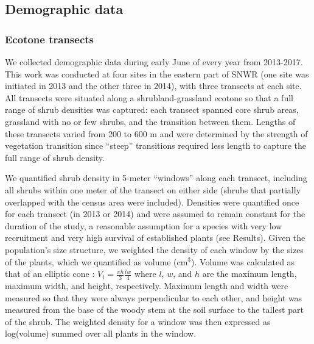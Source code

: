 \documentclass[11pt]{article}\usepackage[]{graphicx}\usepackage[usenames,dvipsnames]{xcolor}
\begin{document}
\subsection*{Demographic data}

\subsubsection*{Ecotone transects}

We collected demographic data during early June of every year from 2013-2017.
This work was conducted at four sites in the eastern part of SNWR (one site was initiated in 2013 and the other three in 2014), with three transects at each site. 
All transects were situated along a shrubland-grassland ecotone so that a full range of shrub densities was captured: each transect spanned core shrub areas, grassland with no or few shrubs, and the transition between them. 
Lengths of these transects varied from 200 to 600 m and were determined by the strength of vegetation transition since ``steep'' transitions required less length to capture the full range of shrub density. 

We quantified shrub density in 5-meter ``windows'' along each transect, including all shrubs within one meter of the transect on either side (shrubs that partially overlapped with the census area were included).
Densities were quantified once for each transect (in 2013 or 2014) and were assumed to remain constant for the duration of the study, a reasonable assumption for a species with very low recruitment and very high survival of established plants (see Results). 
Given the population's size structure, we weighted the density of each window by the sizes of the plants, which we quantified as volume (cm$^3$).
Volume was calculated as that of an elliptic cone \citep{mcauliffe2007landscape}: $V_{i} = \frac{\pi h}{3} \frac{lw}{4}$ where $l$, $w$, and $h$ are the maximum length, maximum width, and height, respectively.
Maximum length and width were measured so that they were always perpendicular to each other, and height was measured from the base of the woody stem at the soil surface to the tallest part of the shrub.
The weighted density for a window was then expressed as log(volume) summed over all plants in the window.
\end{document}
